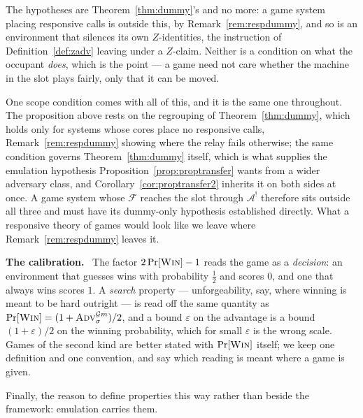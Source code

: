 \documentclass[11pt,a4paper]{article}
\newcommand{\F}{\mathcal{F}}
\newcommand{\Adv}{\mathcal{A}}
\newcommand{\advtg}{\op{Adv}}
\newcommand{\op}[1]{\textsc{#1}}
\newcommand{\Gm}{\mathcal{G}m}
\newcommand{\Win}{\op{Win}}
\newcommand{\heading}[1]{\medskip\par\noindent\textcolor{accent}{\textbf{#1.}}\ }
\theoremstyle{accentdef}
\theoremstyle{accentplain}
\begin{document}
The hypotheses are Theorem~\ref{thm:dummy}'s and no more: a game system placing responsive calls is
outside this, by Remark~\ref{rem:respdummy}, and so is an environment that silences its own
$Z$-identities, the instruction of Definition~\ref{def:zadv} leaving under a $Z$-claim. Neither is a
condition on what the occupant \emph{does}, which is the point --- a game need not care whether the
machine in the slot plays fairly, only that it can be moved.

One scope condition comes with all of this, and it is the same one throughout. The proposition above
rests on the regrouping of Theorem~\ref{thm:dummy}, which holds only for systems whose cores place no
responsive calls, Remark~\ref{rem:respdummy} showing where the relay fails otherwise; the same
condition governs Theorem~\ref{thm:dummy} itself, which is what supplies the emulation hypothesis
Proposition~\ref{prop:proptransfer} wants from a wider adversary class, and
Corollary~\ref{cor:proptransfer2} inherits it on both sides at once. A game system whose $\F$ reaches
the slot through $\Adv^{!}$ therefore sits outside all three and must have its dummy-only hypothesis
established directly. What a responsive theory of games would look like we leave where
Remark~\ref{rem:respdummy} leaves it.

\heading{The calibration} The factor $2\Pr[\Win] - 1$ reads the game as a \emph{decision}: an
environment that guesses wins with probability $\tfrac12$ and scores $0$, and one that always wins
scores $1$. A \emph{search} property --- unforgeability, say, where winning is meant to be hard
outright --- is read off the same quantity as $\Pr[\Win] = (1 + \advtg^{\Gm}_{\sigma})/2$, and a bound
$\varepsilon$ on the advantage is a bound $(1+\varepsilon)/2$ on the winning probability, which for
small $\varepsilon$ is the wrong scale. Games of the second kind are better stated with
$\Pr[\Win]$ itself; we keep one definition and one convention, and say which reading is meant where
a game is given.

Finally, the reason to define properties this way rather than beside the framework: emulation carries
them.
\end{document}
